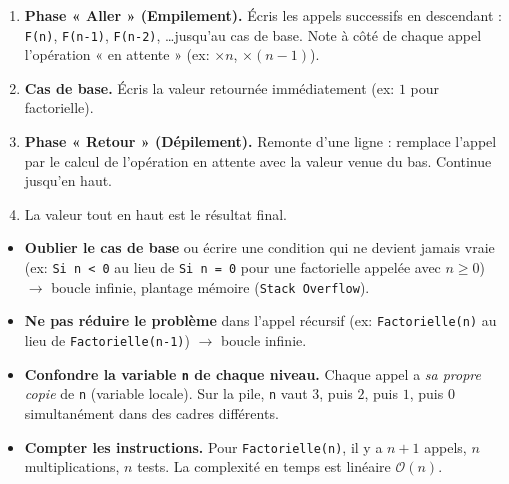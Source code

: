 \documentclass[11pt]{article}
\begin{document}
\begin{methode}
\begin{enumerate}
  \item \textbf{Phase « Aller » (Empilement).} Écris les appels successifs en descendant : \texttt{F(n)}, \texttt{F(n-1)}, \texttt{F(n-2)}, \ldots jusqu'au cas de base. Note à côté de chaque appel l'opération « en attente » (ex: $\times n$, $\times (n-1)$).
  \item \textbf{Cas de base.} Écris la valeur retournée immédiatement (ex: $1$ pour factorielle).
  \item \textbf{Phase « Retour » (Dépilement).} Remonte d'une ligne : remplace l'appel par le calcul de l'opération en attente avec la valeur venue du bas. Continue jusqu'en haut.
  \item La valeur tout en haut est le résultat final.
\end{enumerate}
\end{methode}

\begin{attention}
\begin{itemize}
  \item \textbf{Oublier le cas de base} ou écrire une condition qui ne devient jamais vraie (ex: \texttt{Si n < 0} au lieu de \texttt{Si n = 0} pour une factorielle appelée avec $n \ge 0$) $\rightarrow$ boucle infinie, plantage mémoire (\texttt{Stack Overflow}).
  \item \textbf{Ne pas réduire le problème} dans l'appel récursif (ex: \texttt{Factorielle(n)} au lieu de \texttt{Factorielle(n-1)}) $\rightarrow$ boucle infinie.
  \item \textbf{Confondre la variable \texttt{n} de chaque niveau.} Chaque appel a \emph{sa propre copie} de \texttt{n} (variable locale). Sur la pile, \texttt{n} vaut $3$, puis $2$, puis $1$, puis $0$ simultanément dans des cadres différents.
  \item \textbf{Compter les instructions.} Pour \texttt{Factorielle(n)}, il y a $n+1$ appels, $n$ multiplications, $n$ tests. La complexité en temps est linéaire $\mathcal{O}(n)$.
\end{itemize}
\end{attention}
\end{document}
